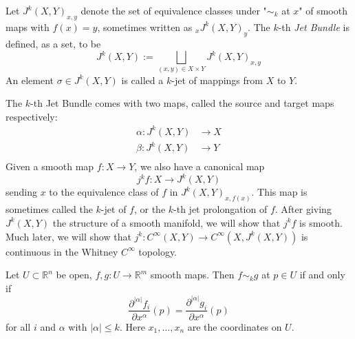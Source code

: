 \documentclass[12pt]{article}
\newcommand{\RR}{\mathbb{R}}
\begin{document}
\begin{definition}
    Let $J^k(X, Y)_{x, y}$ denote the set of equivalence classes under "$\sim_k$ at $x$" of smooth maps with $f(x) = y$, sometimes written as ${}_{x}J^k(X, Y)_y$. The $k$-th \emph{Jet Bundle} is defined, as a set, to be
    $$
    J^k(X, Y) := \bigsqcup_{(x, y)\in X\times Y} J^k(X, Y)_{x, y}
    $$
    An element $\sigma \in J^k(X, Y)$ is called a $k$-jet of mappings from $X$ to $Y$. 
\end{definition}

\begin{remark}
    The $k$-th Jet Bundle comes with two maps, called the source and target maps respectively:
    \begin{align*}
        \alpha: J^k(X, Y) & \to X \\
        \beta: J^k(X, Y) & \to Y \\ 
    \end{align*}
    Given a smooth map $f:X \to Y$, we also have a canonical map 
    $$
    j^k f: X \to J^k(X, Y)
    $$
    sending $x$ to the equivalence class of $f$ in $J^k(X, Y)_{x, f(x)}$. This map is sometimes called the $k$-jet of $f$, or the $k$-th jet prolongation of $f$. After giving $J^k(X, Y)$ the structure of a smooth manifold, we will show that $j^k f$ is smooth. Much later, we will show that $j^k: C^\infty(X, Y) \to C^\infty(X, J^k(X, Y))$ is continuous in the Whitney $C^\infty$ topology. 
\end{remark}


\begin{lemma}
    Let $U\subset \RR^n$ be open, $f, g: U \to \RR^m$ smooth maps. Then $f \sim_k g$ at $p \in U$ if and only if
    $$
    \frac{\partial^{|\alpha|} f_i}{\partial x^\alpha} (p) = \frac{\partial^{|\alpha|} g_i}{\partial x^\alpha} (p) 
    $$
    for all $i$ and $\alpha$ with $|\alpha| \leq k$. Here $x_1, \dots, x_n$ are the coordinates on $U$. 
\end{lemma}
\end{document}
